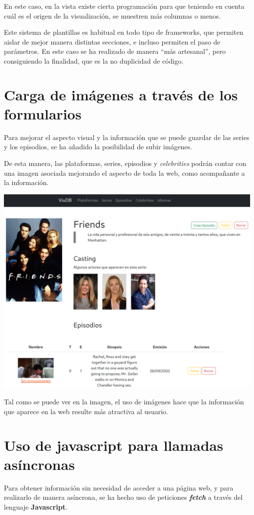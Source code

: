 \documentclass{\ClassPath/viu-tfm-template}
\begin{document}
En este caso, en la vista existe cierta programación para que teniendo en cuenta cuál es el origen de la visualización, se muestren más columnas o menos.

Este sistema de plantillas es habitual en todo tipo de frameworks, que permiten aislar de mejor manera distintas secciones, e incluso permiten el paso de parámetros. En este caso se ha realizado de manera “más artesanal”, pero consiguiendo la finalidad, que es la no duplicidad de código.

\section{Carga de imágenes a través de los formularios}
Para mejorar el aspecto visual y la información que se puede guardar de las series y los episodios, se ha añadido la posibilidad de subir imágenes.

De esta manera, las plataformas, series, episodios y \textit{celebrities} podrán contar con una imagen asociada mejorando el aspecto de toda la web, como acompañante a la información.

\begin{center}
    \includegraphics[frame,width=0.75\linewidth]{img/general.png}
\end{center}
\vspace{-1.5em}

Tal como se puede ver en la imagen, el uso de imágenes hace que la información que aparece en la web resulte más atractiva al usuario.

\section{Uso de javascript para llamadas asíncronas}
Para obtener información sin necesidad de acceder a una página web, y para realizarlo de manera asíncrona, se ha hecho uso de peticiones \textit{\textbf{fetch}} a través del lenguaje \textbf{Javascript}.
\end{document}
